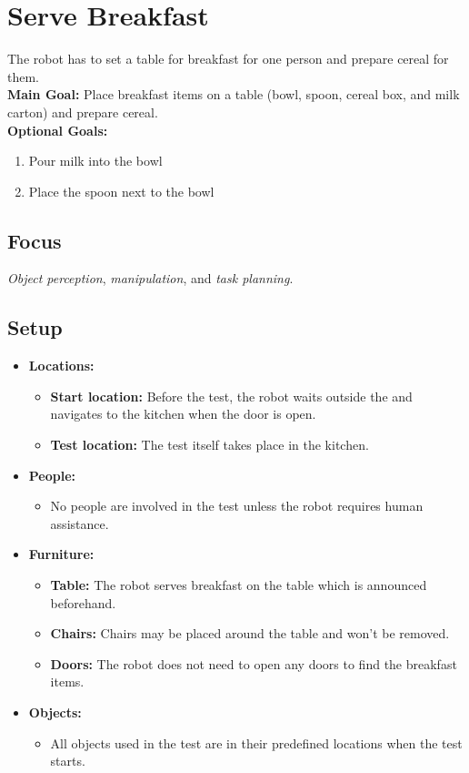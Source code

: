 \section{Serve Breakfast}
\label{test:serve-breakfast}
The robot has to set a table for breakfast for one person and prepare cereal for them.\\

\noindent \textbf{Main Goal:} Place breakfast items on a table (bowl, spoon, cereal box, and milk carton) and prepare cereal.\\

\noindent \textbf{Optional Goals:}
\begin{enumerate}[nosep]
	\item Pour milk into the bowl
	\item Place the spoon next to the bowl
\end{enumerate}

\subsection*{Focus}
\emph{Object perception}, \emph{manipulation}, and \emph{task planning}.

\subsection*{Setup}
\begin{itemize}[nosep]
	\item \textbf{Locations:}
		\begin{itemize}
			\item \textbf{Start location:} Before the test, the robot waits outside the \Arena{} and navigates to the kitchen when the door is open.
			\item \textbf{Test location:} The test itself takes place in the kitchen.
		\end{itemize}
		\item \textbf{People:}
			\begin{itemize}
				\item No people are involved in the test unless the robot requires human assistance.
			\end{itemize}
	\item \textbf{Furniture:}
		\begin{itemize}
			\item \textbf{Table:} The robot serves breakfast on the table which is announced beforehand.
			\item \textbf{Chairs:} Chairs may be placed around the table and won't be removed.
			\item \textbf{Doors:} The robot does not need to open any doors to find the breakfast items.
		\end{itemize}
	\item \textbf{Objects:}
		\begin{itemize}
			\item All objects used in the test are in their predefined locations when the test starts.
		\end{itemize}
\end{itemize}

